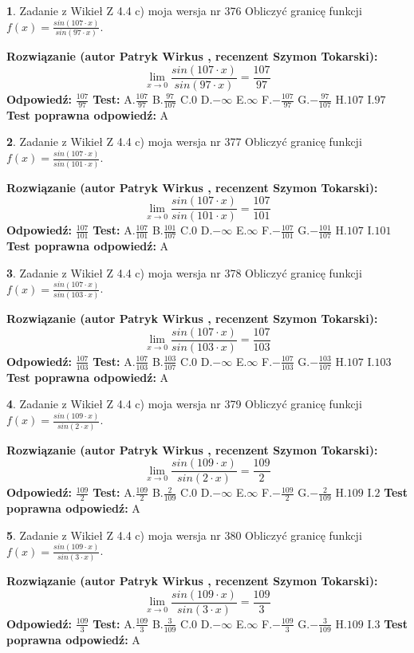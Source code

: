 \documentclass[12pt, a4paper]{article}
\theoremstyle{definition} %
\newtheorem{zad}{}
\newcommand{\zadStart}[1]{\begin{zad}#1\newline}
\newcommand{\zadStop}{\end{zad}}
\newcommand{\rozwStart}[2]{\noindent \textbf{Rozwiązanie (autor #1 , recenzent #2): }\newline}
\newcommand{\rozwStop}{\newline}
\newcommand{\odpStart}{\noindent \textbf{Odpowiedź:}\newline}
\newcommand{\odpStop}{\newline}
\newcommand{\testStart}{\noindent \textbf{Test:}\newline}
\newcommand{\testStop}{\newline}
\newcommand{\kluczStart}{\noindent \textbf{Test poprawna odpowiedź:}\newline}
\newcommand{\kluczStop}{\newline}
\begin{document}
\zadStart{Zadanie z Wikieł Z 4.4 c) moja wersja nr 376}
Obliczyć granicę funkcji $f(x)=\frac{sin(107\cdot x)}{sin(97\cdot x)}$.
\zadStop
\rozwStart{Patryk Wirkus}{Szymon Tokarski}
$$\lim\limits_{x\to 0}\frac{sin(107\cdot x)}{sin(97\cdot x)}=
\frac{107}{97}$$
\rozwStop
\odpStart
$\frac{107}{97}$
\odpStop
\testStart
A.$\frac{107}{97}$
B.$\frac{97}{107}$
C.$0$
D.$-\infty$
E.$\infty$
F.$-\frac{107}{97}$
G.$-\frac{97}{107}$
H.$107$
I.$97$
\testStop
\kluczStart
A
\kluczStop



\zadStart{Zadanie z Wikieł Z 4.4 c) moja wersja nr 377}
Obliczyć granicę funkcji $f(x)=\frac{sin(107\cdot x)}{sin(101\cdot x)}$.
\zadStop
\rozwStart{Patryk Wirkus}{Szymon Tokarski}
$$\lim\limits_{x\to 0}\frac{sin(107\cdot x)}{sin(101\cdot x)}=
\frac{107}{101}$$
\rozwStop
\odpStart
$\frac{107}{101}$
\odpStop
\testStart
A.$\frac{107}{101}$
B.$\frac{101}{107}$
C.$0$
D.$-\infty$
E.$\infty$
F.$-\frac{107}{101}$
G.$-\frac{101}{107}$
H.$107$
I.$101$
\testStop
\kluczStart
A
\kluczStop



\zadStart{Zadanie z Wikieł Z 4.4 c) moja wersja nr 378}
Obliczyć granicę funkcji $f(x)=\frac{sin(107\cdot x)}{sin(103\cdot x)}$.
\zadStop
\rozwStart{Patryk Wirkus}{Szymon Tokarski}
$$\lim\limits_{x\to 0}\frac{sin(107\cdot x)}{sin(103\cdot x)}=
\frac{107}{103}$$
\rozwStop
\odpStart
$\frac{107}{103}$
\odpStop
\testStart
A.$\frac{107}{103}$
B.$\frac{103}{107}$
C.$0$
D.$-\infty$
E.$\infty$
F.$-\frac{107}{103}$
G.$-\frac{103}{107}$
H.$107$
I.$103$
\testStop
\kluczStart
A
\kluczStop



\zadStart{Zadanie z Wikieł Z 4.4 c) moja wersja nr 379}
Obliczyć granicę funkcji $f(x)=\frac{sin(109\cdot x)}{sin(2\cdot x)}$.
\zadStop
\rozwStart{Patryk Wirkus}{Szymon Tokarski}
$$\lim\limits_{x\to 0}\frac{sin(109\cdot x)}{sin(2\cdot x)}=
\frac{109}{2}$$
\rozwStop
\odpStart
$\frac{109}{2}$
\odpStop
\testStart
A.$\frac{109}{2}$
B.$\frac{2}{109}$
C.$0$
D.$-\infty$
E.$\infty$
F.$-\frac{109}{2}$
G.$-\frac{2}{109}$
H.$109$
I.$2$
\testStop
\kluczStart
A
\kluczStop



\zadStart{Zadanie z Wikieł Z 4.4 c) moja wersja nr 380}
Obliczyć granicę funkcji $f(x)=\frac{sin(109\cdot x)}{sin(3\cdot x)}$.
\zadStop
\rozwStart{Patryk Wirkus}{Szymon Tokarski}
$$\lim\limits_{x\to 0}\frac{sin(109\cdot x)}{sin(3\cdot x)}=
\frac{109}{3}$$
\rozwStop
\odpStart
$\frac{109}{3}$
\odpStop
\testStart
A.$\frac{109}{3}$
B.$\frac{3}{109}$
C.$0$
D.$-\infty$
E.$\infty$
F.$-\frac{109}{3}$
G.$-\frac{3}{109}$
H.$109$
I.$3$
\testStop
\kluczStart
A
\kluczStop
\end{document}
